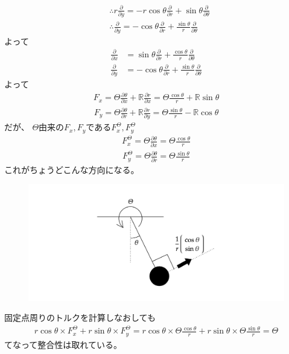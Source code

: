 \documentclass[a4paper,11pt]{jsarticle}
\begin{document}
\begin{align*}
  &\therefore r \frac{\partial }{\partial y} = -r\cos\theta \frac{\partial }{\partial r} + \sin\theta \frac{\partial }{\partial \theta}
  \\& \therefore \frac{\partial }{\partial y} = -\cos\theta \frac{\partial }{\partial r} + \frac{\sin\theta}{r} \frac{\partial }{\partial \theta}
\end{align*}
よって
\begin{align*}
  \frac{\partial }{\partial x} &= \sin\theta \frac{\partial }{\partial r} + \frac{\cos\theta}{r} \frac{\partial }{\partial \theta}
  \\ \frac{\partial }{\partial y} &= -\cos\theta \frac{\partial }{\partial r} + \frac{\sin\theta}{r} \frac{\partial }{\partial \theta}
\end{align*}
よって
\begin{align*}
  F_x = \Theta \frac{\partial \theta}{\partial x} + \mathbb{R}\frac{\partial r}{\partial x}
  = \Theta \frac{\cos\theta}{r} + \mathbb{R}\sin\theta
\end{align*}
\begin{align*}
  F_y = \Theta \frac{\partial \theta}{\partial r} + \mathbb{R}\frac{\partial r}{\partial y}
   = \Theta \frac{\sin\theta}{r} - \mathbb{R} \cos\theta
\end{align*}
だが、
$\Theta$由来の$F_x, F_y$である$F_x^\Theta, F_y^\Theta$
\begin{align*}
  F_x^\Theta = \Theta \frac{\partial \theta}{\partial x}
   = \Theta \frac{\cos\theta}{r}
\end{align*}
\begin{align*}
  F_y^\Theta = \Theta \frac{\partial \theta}{\partial r}
   = \Theta \frac{\sin\theta}{r}
\end{align*}
これがちょうどこんな方向になる。
\begin{figure}[h]
  \centering
  \includegraphics[width = 1\textwidth]{20210514_Single_Pendulumpng_With_Tau_Force.png}
  \caption{}
  \label{}
\end{figure}
固定点周りのトルクを計算しなおしても
\begin{align*}
  r\cos\theta \times F_x^\Theta + r\sin\theta \times F_y^\Theta = r\cos\theta \times \Theta \frac{\cos\theta}{r} + r\sin\theta\times\Theta\frac{\sin\theta}{r}
  = \Theta
\end{align*}
てなって整合性は取れている。
\end{document}
